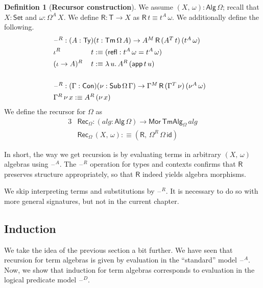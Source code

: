 \documentclass[12pt,a4paper,twoside,openany]{book}
\theoremstyle{remark}
\theoremstyle{definition}
\newtheorem{mydefinition}{Definition}
\theoremstyle{theorem}
\newcommand{\mi}[1]{\mathit{#1}}
\newcommand{\ms}[1]{\mathsf{#1}}
\newcommand{\refl}{\mathsf{refl}}
\newcommand{\id}{\mathsf{id}}
\newcommand{\Con}{\mathsf{Con}}
\newcommand{\Sub}{\mathsf{Sub}}
\newcommand{\Tm}{\mathsf{Tm}}
\newcommand{\Ty}{\mathsf{Ty}}
\newcommand{\blank}{\mathord{\hspace{1pt}\text{--}\hspace{1pt}}}
\newcommand{\Set}{\mathsf{Set}}
\newcommand{\app}{\ms{app}}
\newcommand{\Alg}{\ms{Alg}}
\newcommand{\Mor}{\ms{Mor}}
\newcommand{\TmAlg}{\ms{TmAlg}}
\newcommand{\Rec}{\ms{Rec}}
\newcommand{\defn}{:\equiv}
\begin{document}
\begin{mydefinition}[\textbf{Recursor construction}]\label{def:simple-recursor} We assume $(X,\,\omega) : \Alg\,\Omega$;
recall that $X : \Set$ and $\omega : \Omega^A\,X$. We define $\ms{R} : \ms{T} \to X$
as $\ms{R}\,t \equiv t^A\,\omega$. We additionally define the following.
\begin{alignat*}{3}
& \hspace{-6em}\rlap{$\blank^R : (A : \Ty)(t : \Tm\,\Omega\,A) \to A^M\,\ms{R}\,(A^T\,t)\,(t^A\,\omega)$}\\
& \hspace{-6em}\iota^R\,&&t \defn (\refl : t^A\,\omega = t^A\,\omega)\\
& \hspace{-6em}(\iota\to A)^R\,&&t \defn \lambda\,u.\,A^R\,(\app\,t\,u)\\
& \hspace{-6em}&& \\
& \hspace{-6em}\rlap{$\blank^R : (\Gamma : \Con)(\nu : \Sub\,\Omega\,\Gamma) \to \Gamma^M\,\ms{R}\,(\Gamma^T\,\nu)\,(\nu^A\,\omega)$}\\
& \hspace{-6em}\rlap{$\Gamma^R\,\nu\,x \defn A^R\,(\nu\,x)$}
\end{alignat*}
We define the recursor for $\Omega$ as
\begin{alignat*}{3}
  & \Rec_{\Omega} : (\mi{alg} : \Alg\,\Omega) \to \Mor\,\TmAlg_{\Omega}\,\mi{alg}\\
  & \Rec_{\Omega}\,(X,\,\omega) \defn (\ms{R},\,\Omega^R\,\Omega\,\id)
\end{alignat*}
\end{mydefinition}

In short, the way we get recursion is by evaluating terms in arbitrary
$(X,\,\omega)$ algebras using $\blank^A$. The $\blank^R$ operation for types and
contexts confirms that $\ms{R}$ preserves structure appropriately, so that
$\ms{R}$ indeed yields algebra morphisms.

We skip interpreting terms and substitutions by $\blank^R$. It is necessary to
do so with more general signatures, but not in the current chapter.

\subsection{Induction}

We take the idea of the previous section a bit further. We have seen that
recursion for term algebras is given by evaluation in the ``standard'' model
$\blank^A$. Now, we show that induction for term algebras corresponds to
evaluation in the logical predicate model $\blank^D$.
\end{document}
